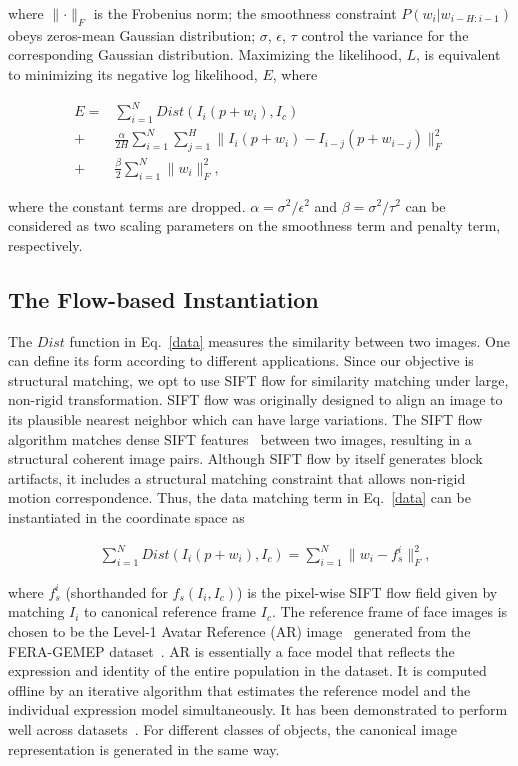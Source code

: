 \documentclass[review]{elsarticle}
\begin{document}
\noindent where $\parallel \cdot \parallel_F$ is the Frobenius norm; the smoothness constraint $P(w_i|w_{i-H:i-1})$ obeys zeros-mean Gaussian distribution; $\sigma$, $\epsilon$, $\tau$ control the variance for the corresponding Gaussian distribution. Maximizing the likelihood, $L$, is equivalent to minimizing its negative log likelihood, $E$, where

\begin{align}
\label{data}
E = &\sum_{i=1}^{N}Dist(I_i(p+w_i),I_c) \\
\label{smooth}
+ &\frac{\alpha}{2H}\sum_{i=1}^{N}\sum_{j=1}^{H}\parallel{I_i(p+w_i)-I_{i-j}(p+w_{i-j})}\parallel_F^2 \\
\label{penalty}
+ &\frac{\beta}{2}\sum_{i=1}^{N}\parallel{w_i}\parallel_F^2,
\end{align}


\noindent where the constant terms are dropped. $\alpha=\sigma^2 / \epsilon^2$ and $\beta=\sigma^2 / \tau^2$ can be considered as two scaling parameters on the smoothness term and penalty term, respectively. 

\subsection{The Flow-based Instantiation}

The $Dist$ function in Eq.~\eqref{data} measures the similarity between two images. One can define its form according to different applications. Since our objective is structural matching, we opt to use SIFT flow \cite{Liu_PAMI11} for similarity matching under large, non-rigid transformation. SIFT flow \cite{Liu_PAMI11} was originally designed to align an image to its plausible nearest neighbor which can have large variations. The SIFT flow algorithm matches dense SIFT features~\cite{SIFT} between two images, resulting in a structural coherent image pairs. Although SIFT flow by itself generates block artifacts, it includes a structural matching constraint that allows non-rigid motion correspondence. Thus, the data matching term in Eq.~\eqref{data} can be instantiated in the coordinate space as

\begin{align}
\label{data_sift}
&\sum_{i=1}^{N}Dist(I_i(p+w_i),I_c)=\sum_{i=1}^{N}\parallel{w_i-f_s^i}\parallel_F^2,
\end{align}

\noindent where $f_s^i$ (shorthanded for $f_s(I_i,I_c)$) is the pixel-wise SIFT flow field given by matching $I_i$ to canonical reference frame $I_c$. The reference frame of face images is chosen to be the Level-1 Avatar Reference (AR) image~\cite{Yang_SMCB12} generated from the FERA-GEMEP dataset~\cite{Valstar_FERA11}. AR is essentially a face model that reflects the expression and identity of the entire population in the dataset. It is computed offline by an iterative algorithm that estimates the reference model and the individual expression model simultaneously. It has been demonstrated to perform well across datasets~\cite{Yang_SMCB12}. For different classes of objects, the canonical image representation is generated in the same way.
\end{document}

